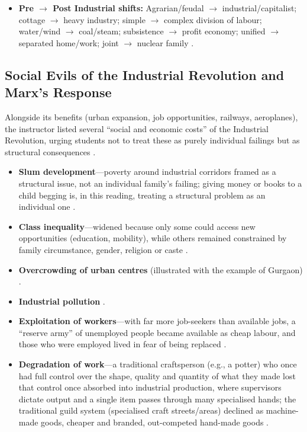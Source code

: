\begin{QuickRevision}
\begin{itemize}
    \item \textbf{Pre $\rightarrow$ Post Industrial shifts:} Agrarian/feudal $\rightarrow$ industrial/capitalist; cottage $\rightarrow$ heavy industry; simple $\rightarrow$ complex division of labour; water/wind $\rightarrow$ coal/steam; subsistence $\rightarrow$ profit economy; unified $\rightarrow$ separated home/work; joint $\rightarrow$ nuclear family .
\end{itemize}
\end{QuickRevision}

\subsection{Social Evils of the Industrial Revolution and Marx's Response}
Alongside its benefits (urban expansion, job opportunities, railways, aeroplanes), the instructor listed several ``social and economic costs'' of the Industrial Revolution, urging students not to treat these as purely individual failings but as structural consequences .

\begin{CriticalPoint}
\begin{itemize}
    \item \textbf{Slum development}---poverty around industrial corridors framed as a structural issue, not an individual family's failing; giving money or books to a child begging is, in this reading, treating a structural problem as an individual one .
    \item \textbf{Class inequality}---widened because only some could access new opportunities (education, mobility), while others remained constrained by family circumstance, gender, religion or caste .
    \item \textbf{Overcrowding of urban centres} (illustrated with the example of Gurgaon) .
    \item \textbf{Industrial pollution} .
    \item \textbf{Exploitation of workers}---with far more job-seekers than available jobs, a ``reserve army'' of unemployed people became available as cheap labour, and those who were employed lived in fear of being replaced .
    \item \textbf{Degradation of work}---a traditional craftsperson (e.g., a potter) who once had full control over the shape, quality and quantity of what they made lost that control once absorbed into industrial production, where supervisors dictate output and a single item passes through many specialised hands; the traditional guild system (specialised craft streets/areas) declined as machine-made goods, cheaper and branded, out-competed hand-made goods .
\end{itemize}
\end{CriticalPoint}


